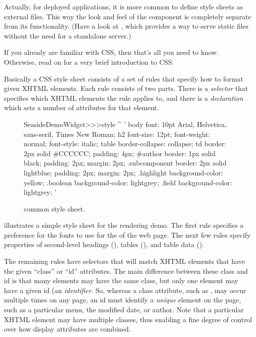 \documentclass[a4paper,10pt,twoside]{book}
\begin{document}
Actually, for deployed applications, it is more common to define style sheets as external files.
This way the look and feel of the component is completely separate from its functionality.
(Have a look at , which provides a way to serve static files without the need for a standalone server.)

If you already are familiar with CSS, then that's all you need to know.
Otherwise, read on for a very brief introduction to CSS.

Basically a CSS style sheet consists of a set of rules that specify how to format given XHTML elements.
Each rule consists of two parts.
There is a \emph{selector} that specifies which XHTML elements the rule applies to, and there is a \emph{declaration} which sets a number of attributes for that element.

\begin{figure}[tb]
\begin{code}{}
SeasideDemoWidget>>>style
	^ '
body {
	font: 10pt Arial, Helvetica, sans-serif, Times New Roman;
}
h2 {
	font-size: 12pt;
	font-weight: normal;
	font-style: italic;
}
table { border-collapse: collapse; }
td {
	border: 2px solid #CCCCCC;
	padding: 4px;
}
#author {
	border: 1px solid black;
	padding: 2px;
	margin: 2px;
}
.subcomponent {
	border: 2px solid lightblue;
	padding: 2px;
	margin: 2px;
}
.highlight { background-color: yellow; }
.boolean { background-color: lightgrey; }
.field { background-color: lightgrey; }
'
\end{code}
\caption{ common style sheet.
\label{fig:democss}}
\end{figure}
 illustrates a simple style sheet for the rendering demo.
The first rule specifies a preference for the fonts to use for the  of the web page.
The next few rules specify properties of second-level headings (), tables (), and table data ().

The remaining rules have selectors that will match XHTML elements that have the given ``class'' or ``id'' attributes.
The main difference between these class and id is that many elements may have the same class, but only one element may have a given id (\ie an \emph{identifier}. 
So, whereas a class attribute, such as , may occur multiple times on any page, an id must identify a \emph{unique} element on the page, such as a particular menu, the modified date, or author.
Note that a particular XHTML element may have multiple classes, thus enabling a fine degree of control over how display attributes are combined. 
\end{document}
